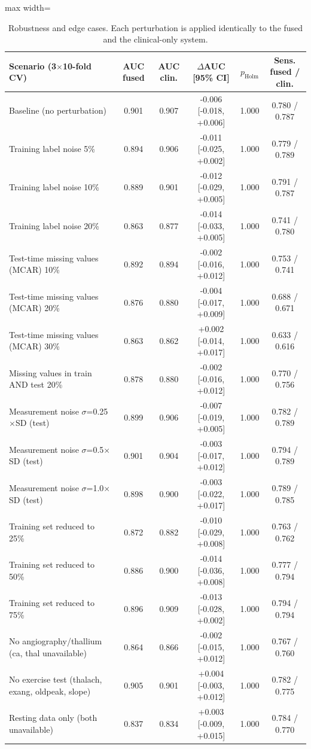 \begin{table}[!t]
\centering
\scriptsize
\caption{Robustness and edge cases. Each perturbation is applied identically to the fused and the clinical-only system.}
\label{tab:e5}
\setlength{\tabcolsep}{3pt}
\begin{adjustbox}{max width=\linewidth}
\begin{tabular}{lccccc}
\toprule
Scenario (3$\times$10-fold CV) & AUC fused & AUC clin. & $\Delta$AUC [95\% CI] & $p_{\mathrm{Holm}}$ & Sens. fused / clin. \\
\midrule
Baseline (no perturbation) & 0.901 & 0.907 & -0.006 [-0.018, +0.006] & 1.000 & 0.780 / 0.787 \\
Training label noise 5\% & 0.894 & 0.906 & -0.011 [-0.025, +0.002] & 1.000 & 0.779 / 0.789 \\
Training label noise 10\% & 0.889 & 0.901 & -0.012 [-0.029, +0.005] & 1.000 & 0.791 / 0.787 \\
Training label noise 20\% & 0.863 & 0.877 & -0.014 [-0.033, +0.005] & 1.000 & 0.741 / 0.780 \\
Test-time missing values (MCAR) 10\% & 0.892 & 0.894 & -0.002 [-0.016, +0.012] & 1.000 & 0.753 / 0.741 \\
Test-time missing values (MCAR) 20\% & 0.876 & 0.880 & -0.004 [-0.017, +0.009] & 1.000 & 0.688 / 0.671 \\
Test-time missing values (MCAR) 30\% & 0.863 & 0.862 & +0.002 [-0.014, +0.017] & 1.000 & 0.633 / 0.616 \\
Missing values in train AND test 20\% & 0.878 & 0.880 & -0.002 [-0.016, +0.012] & 1.000 & 0.770 / 0.756 \\
Measurement noise $\sigma$=0.25$\times$SD (test) & 0.899 & 0.906 & -0.007 [-0.019, +0.005] & 1.000 & 0.782 / 0.789 \\
Measurement noise $\sigma$=0.5$\times$SD (test) & 0.901 & 0.904 & -0.003 [-0.017, +0.012] & 1.000 & 0.794 / 0.789 \\
Measurement noise $\sigma$=1.0$\times$SD (test) & 0.898 & 0.900 & -0.003 [-0.022, +0.017] & 1.000 & 0.789 / 0.785 \\
Training set reduced to 25\% & 0.872 & 0.882 & -0.010 [-0.029, +0.008] & 1.000 & 0.763 / 0.762 \\
Training set reduced to 50\% & 0.886 & 0.900 & -0.014 [-0.036, +0.008] & 1.000 & 0.777 / 0.794 \\
Training set reduced to 75\% & 0.896 & 0.909 & -0.013 [-0.028, +0.002] & 1.000 & 0.794 / 0.794 \\
No angiography/thallium (ca, thal unavailable) & 0.864 & 0.866 & -0.002 [-0.015, +0.012] & 1.000 & 0.767 / 0.760 \\
No exercise test (thalach, exang, oldpeak, slope) & 0.905 & 0.901 & +0.004 [-0.003, +0.012] & 1.000 & 0.782 / 0.775 \\
Resting data only (both unavailable) & 0.837 & 0.834 & +0.003 [-0.009, +0.015] & 1.000 & 0.784 / 0.770 \\
\bottomrule
\end{tabular}
\end{adjustbox}
\end{table}
